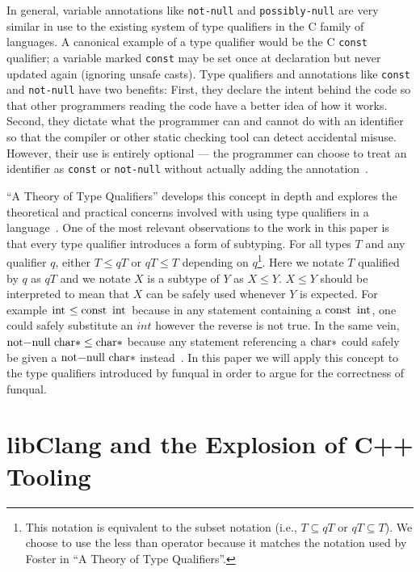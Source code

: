 In general, variable annotations like \lstinline{not-null} and \lstinline{possibly-null} are very similar in use to the existing system of type qualifiers in the C family of languages.  A canonical example of a type qualifier would be the C \lstinline{const} qualifier; a variable marked \lstinline{const} may be set once at declaration but never updated again (ignoring unsafe casts).  Type qualifiers and annotations like \lstinline{const} and \lstinline{not-null} have two benefits:  First, they declare the intent behind the code so that other programmers reading the code have a better idea of how it works.  Second, they dictate what the programmer can and cannot do with an identifier so that the compiler or other static checking tool can detect accidental misuse.  However, their use is entirely optional --- the programmer can choose to treat an identifier as \lstinline{const} or \lstinline{not-null} without actually adding the annotation~\cite{theory-of-qual}.

``A Theory of Type Qualifiers'' develops this concept in depth and explores the theoretical and practical concerns involved with using type qualifiers in a language~\cite{theory-of-qual}.  One of the most relevant observations to the work in this paper is that every type qualifier introduces a form of subtyping.  For all types $T$ and any qualifier $q$, either $T \leq q T$ or $q T \leq T$ depending on $q$\footnote{This notation is equivalent to the subset notation (i.e., $T \subseteq q T$ or $q T \subseteq T$).  We choose to use the less than operator because it matches the notation used by Foster in ``A Theory of Type Qualifiers''.}.  Here we notate $T$ qualified by $q$ as $q T$ and we notate $X$ is a subtype of $Y$ as $X \leq Y$.  $X \leq Y$ should be interpreted to mean that $X$ can be safely used whenever $Y$ is expected.  For example $\lstinline{int} \leq \lstinline{const int}$ because in any statement containing a $\lstinline{const int}$, one could safely substitute an $int$ however the reverse is not true.  In the same vein, $\lstinline{not-null char*} \leq \lstinline{char*}$ because any statement referencing a $\lstinline{char*}$ could safely be given a $\lstinline{not-null char*}$ instead~\cite{theory-of-qual}.  In this paper we will apply this concept to the type qualifiers introduced by funqual in order to argue for the correctness of funqual.  

\section{libClang and the Explosion of C++ Tooling}\label{sec:related:libclang}

